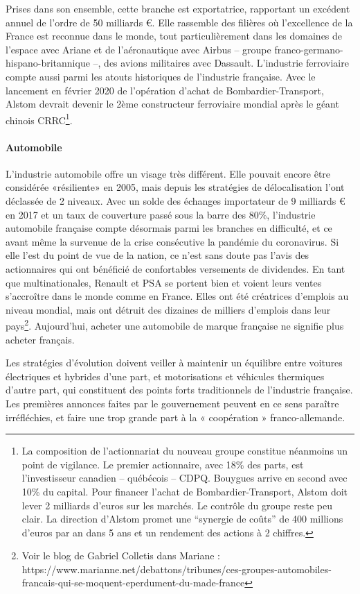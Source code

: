 \documentclass[a4paper]{article}
\begin{document}
Prises dans son ensemble, cette branche est exportatrice, rapportant un excédent annuel de l’ordre de 50 milliards €. Elle rassemble des filières où l’excellence de la France est reconnue dans le monde, tout particulièrement dans les domaines de l’espace avec Ariane et de l’aéronautique avec Airbus – groupe franco-germano-hispano-britannique –, des avions militaires avec Dassault.  L’industrie ferroviaire compte aussi parmi les atouts historiques de l’industrie française. Avec le lancement en février 2020 de l’opération d’achat de Bombardier-Transport, Alstom devrait devenir le 2ème constructeur ferroviaire mondial après le géant chinois CRRC\footnote{La composition de l’actionnariat du nouveau groupe constitue néanmoins un point de vigilance. Le premier actionnaire, avec 18\% des parts, est l’investisseur canadien – québécois – CDPQ. Bouygues arrive en second avec 10\% du capital. Pour financer l’achat de Bombardier-Transport, Alstom doit lever 2 milliards d'euros sur les marchés. Le contrôle du groupe reste peu clair. La direction d’Alstom promet une “synergie de coûts” de 400 millions d'euros par an dans 5 ans et un rendement des actions à 2 chiffres.}.  

\paragraph{Automobile}
L’industrie automobile offre un visage très différent. Elle pouvait encore être considérée «résiliente»  en 2005, mais depuis les stratégies de délocalisation l’ont déclassée de 2 niveaux. Avec un solde des échanges importateur de 9 milliards € en 2017 et un taux de couverture passé sous la barre des 80\%, l’industrie automobile française compte désormais parmi les branches en difficulté, et ce avant même la survenue de la crise consécutive  la pandémie du coronavirus. Si elle l’est du point de vue de la nation, ce n’est sans doute pas l’avis des actionnaires qui ont bénéficié de confortables versements de dividendes. En tant que multinationales, Renault et PSA se portent bien et voient leurs ventes s’accroître dans le monde comme en France. Elles ont été créatrices d’emplois au niveau mondial, mais ont détruit des dizaines de milliers d’emplois dans leur pays\footnote{Voir le blog de Gabriel Colletis dans Mariane : https://www.marianne.net/debattons/tribunes/ces-groupes-automobiles-francais-qui-se-moquent-eperdument-du-made-france}. Aujourd’hui, acheter une automobile de marque française ne signifie plus acheter français.

Les stratégies d’évolution doivent veiller à maintenir un équilibre entre voitures électriques et hybrides d’une part, et motorisations et véhicules thermiques d’autre part, qui constituent des points forts traditionnels de l’industrie française. Les premières annonces faites par le gouvernement peuvent en ce sens paraître irréfléchies, et faire une trop grande part à la « coopération » franco-allemande. 
\end{document}

